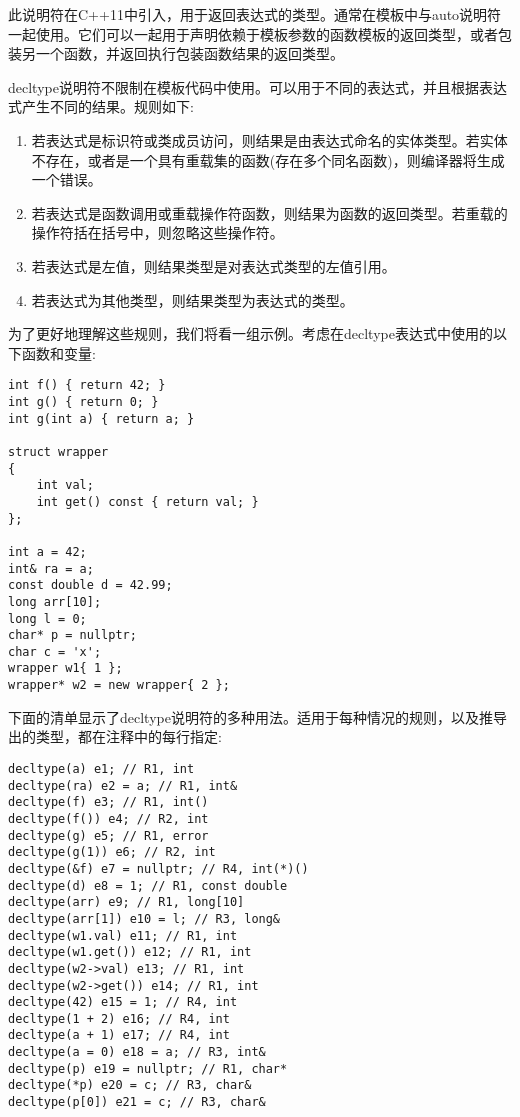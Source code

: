 此说明符在C++11中引入，用于返回表达式的类型。通常在模板中与auto说明符一起使用。它们可以一起用于声明依赖于模板参数的函数模板的返回类型，或者包装另一个函数，并返回执行包装函数结果的返回类型。

decltype说明符不限制在模板代码中使用。可以用于不同的表达式，并且根据表达式产生不同的结果。规则如下:

\begin{enumerate}
\item
若表达式是标识符或类成员访问，则结果是由表达式命名的实体类型。若实体不存在，或者是一个具有重载集的函数(存在多个同名函数)，则编译器将生成一个错误。

\item
若表达式是函数调用或重载操作符函数，则结果为函数的返回类型。若重载的操作符括在括号中，则忽略这些操作符。

\item
若表达式是左值，则结果类型是对表达式类型的左值引用。

\item
若表达式为其他类型，则结果类型为表达式的类型。
\end{enumerate}

为了更好地理解这些规则，我们将看一组示例。考虑在decltype表达式中使用的以下函数和变量:

\begin{lstlisting}[style=styleCXX]
int f() { return 42; }
int g() { return 0; }
int g(int a) { return a; }

struct wrapper
{
	int val;
	int get() const { return val; }
};

int a = 42;
int& ra = a;
const double d = 42.99;
long arr[10];
long l = 0;
char* p = nullptr;
char c = 'x';
wrapper w1{ 1 };
wrapper* w2 = new wrapper{ 2 };
\end{lstlisting}

下面的清单显示了decltype说明符的多种用法。适用于每种情况的规则，以及推导出的类型，都在注释中的每行指定:

\begin{lstlisting}[style=styleCXX]
decltype(a) e1; // R1, int
decltype(ra) e2 = a; // R1, int&
decltype(f) e3; // R1, int()
decltype(f()) e4; // R2, int
decltype(g) e5; // R1, error
decltype(g(1)) e6; // R2, int
decltype(&f) e7 = nullptr; // R4, int(*)()
decltype(d) e8 = 1; // R1, const double
decltype(arr) e9; // R1, long[10]
decltype(arr[1]) e10 = l; // R3, long&
decltype(w1.val) e11; // R1, int
decltype(w1.get()) e12; // R1, int
decltype(w2->val) e13; // R1, int
decltype(w2->get()) e14; // R1, int
decltype(42) e15 = 1; // R4, int
decltype(1 + 2) e16; // R4, int
decltype(a + 1) e17; // R4, int
decltype(a = 0) e18 = a; // R3, int&
decltype(p) e19 = nullptr; // R1, char*
decltype(*p) e20 = c; // R3, char&
decltype(p[0]) e21 = c; // R3, char&
\end{lstlisting}

